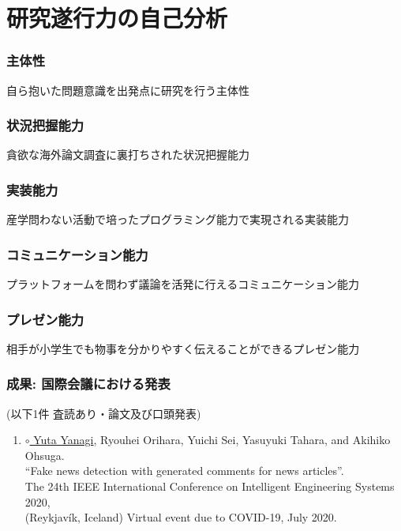
\section{研究遂行力の自己分析}

\noindent
{}
\vspace{-5mm}
\subsubsection*{主体性}
自ら抱いた問題意識を出発点に研究を行う主体性

\subsubsection*{状況把握能力}
貪欲な海外論文調査に裏打ちされた状況把握能力

\subsubsection*{実装能力}
産学問わない活動で培ったプログラミング能力で実現される実装能力

\subsubsection*{コミュニケーション能力}
プラットフォームを問わず議論を活発に行えるコミュニケーション能力

\subsubsection*{プレゼン能力}
相手が小学生でも物事を分かりやすく伝えることができるプレゼン能力

\subsubsection*{成果: 国際会議における発表}
(以下1件 査読あり・論文及び口頭発表)
\begin{enumerate}
    \item \underline{$\circ$ Yuta Yanagi}, Ryouhei Orihara, Yuichi Sei, Yasuyuki Tahara, and Akihiko Ohsuga.\\
    ``Fake news detection with generated comments for news articles''.\\
    The 24th IEEE International Conference on Intelligent Engineering Systems 2020,\\
    (Reykjavík, Iceland) Virtual event due to COVID-19, July 2020.
\end{enumerate}

